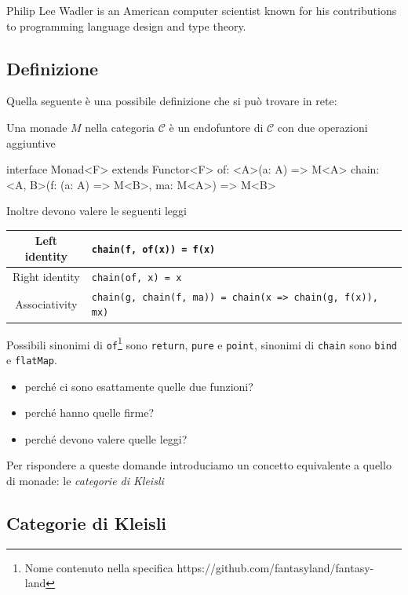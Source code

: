 \documentclass[12pt]{article}
\theoremstyle{definition}
\newenvironment{code}
  {\vspace{0.5cm} \VerbatimEnvironment\begin{typescriptcode}}
  {\end{typescriptcode} \vspace{0.2cm}}
\begin{document}
Philip Lee Wadler is an American computer scientist known for his contributions to programming language design and type theory.

\subsection{Definizione}

Quella seguente è una possibile definizione che si può trovare in rete:

Una monade $M$ nella categoria $\mathcal{C}$ è un endofuntore di $\mathcal{C}$ con due operazioni aggiuntive

\begin{code}
interface Monad<F> extends Functor<F> {
  of: <A>(a: A) => M<A>
  chain: <A, B>(f: (a: A) => M<B>, ma: M<A>) => M<B>
}
\end{code}

Inoltre devono valere le seguenti leggi

\begin{center}
\bgroup
\def\arraystretch{1.5}
\begin{tabular}{ |c|p{10cm}| }
\hline
Left identity & \texttt{chain(f, of(x)) = f(x)} \\
\hline
Right identity & \texttt{chain(of, x) = x} \\
\hline
Associativity & \texttt{chain(g, chain(f, ma)) = chain(x => chain(g, f(x)), mx)} \\
\hline
\end{tabular}
\egroup
\end{center}

Possibili sinonimi di \texttt{of}\footnote{Nome contenuto nella specifica https://github.com/fantasyland/fantasy-land} sono \texttt{return}, \texttt{pure} e \texttt{point}, sinonimi di \texttt{chain} sono \texttt{bind} e \texttt{flatMap}.

\begin{itemize}
  \item perché ci sono esattamente quelle due funzioni?
  \item perché hanno quelle firme?
  \item perché devono valere quelle leggi?
\end{itemize}

Per rispondere a queste domande introduciamo un concetto equivalente a quello di monade: le \emph{categorie di Kleisli}

\subsection{Categorie di Kleisli}
\end{document}
